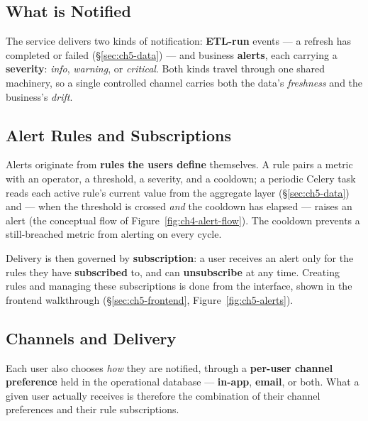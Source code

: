 \subsection{What is Notified}

The service delivers two kinds of notification: \textbf{ETL-run} events --- a refresh has completed or
failed (\S\ref{sec:ch5-data}) --- and business \textbf{alerts}, each carrying a \textbf{severity}:
\emph{info}, \emph{warning}, or \emph{critical}. Both kinds travel through one shared machinery, so a
single controlled channel carries both the data's \emph{freshness} and the business's \emph{drift}.

\subsection{Alert Rules and Subscriptions}

Alerts originate from \textbf{rules the users define} themselves. A rule pairs a metric with an operator,
a threshold, a severity, and a cooldown; a periodic Celery task reads each active rule's current value
from the aggregate layer (\S\ref{sec:ch5-data}) and --- when the threshold is crossed \emph{and} the
cooldown has elapsed --- raises an alert (the conceptual flow of Figure~\ref{fig:ch4-alert-flow}). The
cooldown prevents a still-breached metric from alerting on every cycle.

Delivery is then governed by \textbf{subscription}: a user receives an alert only for the rules they have
\textbf{subscribed} to, and can \textbf{unsubscribe} at any time. Creating rules and managing these
subscriptions is done from the interface, shown in the frontend walkthrough
(\S\ref{sec:ch5-frontend}, Figure~\ref{fig:ch5-alerts}).

\subsection{Channels and Delivery}

Each user also chooses \emph{how} they are notified, through a \textbf{per-user channel preference} held
in the operational database --- \textbf{in-app}, \textbf{email}, or both. What a given user actually
receives is therefore the combination of their channel preferences and their rule subscriptions.

